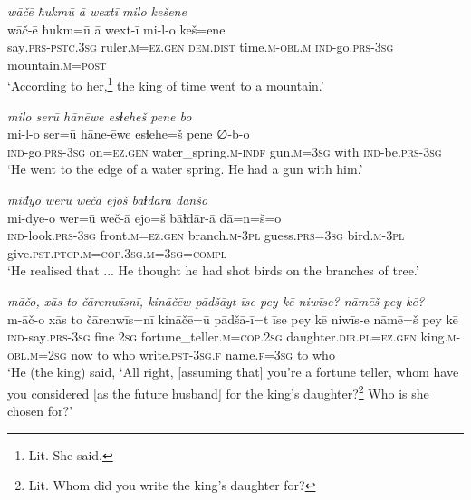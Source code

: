 \ea \label{KŠ.3}
\textit{wāčē ħukmū ā wextī milo kešene} \\ 
\gll wāč-ē ħukm=ū ā wext-ī mi-l-o keš=ene \\ 
 say\textsc{.prs}\textsc{-pstc}\textsc{.3sg} ruler\textsc{.m}\textsc{=ez.gen} \textsc{dem.dist} time\textsc{.m}\textsc{-obl}\textsc{.m} \textsc{ind-}go\textsc{.prs}\textsc{-3sg} mountain\textsc{.m}\textsc{=\textsc{post}} \\ 
\glt `According to her,\footnote{Lit. She said.} the king of time went to a mountain.'
\z 
 
\ea \label{KŠ.4}
\textit{milo serū hānēwe esɫeheš pene bo} \\ 
\gll mi-l-o ser=ū hāne-ēwe esɫehe=š pene ∅-b-o \\ 
 \textsc{ind-}go\textsc{.prs}\textsc{-3sg} on\textsc{=ez.gen} water\_spring\textsc{.m}\textsc{-indf} gun\textsc{.m}\textsc{=3sg} with \textsc{ind-}be\textsc{.prs}\textsc{-3sg} \\ 
\glt `He went to the edge of a water spring. He had a gun with him.'
\z 
 
\ea \label{KŠ.5}
\textit{miđyo werū wečā ejoš bāɫdārā dānšo} \\ 
\gll mi-đye-o wer=ū weč-ā ejo=š bāɫdār-ā dā=n=š=o \\ 
 \textsc{ind-}look\textsc{.prs}\textsc{-3sg} front\textsc{.m}\textsc{=ez.gen} branch\textsc{.m}\textsc{-3pl} guess\textsc{.prs}\textsc{=3sg} bird\textsc{.m}\textsc{-3pl} give\textsc{.pst}\textsc{.ptcp}\textsc{.m}\textsc{=cop}\textsc{.3sg}\textsc{.m}\textsc{=3sg}\textsc{=compl} \\ 
\glt `He realised that ... He thought he had shot birds on the branches of tree.'
\z 
 
\ea \label{KŠ.12}
\textit{māčo, xās to čārenwīsnī, kināčēw pādšāyt īse pey kē niwīse? nāmēš pey kē?} \\ 
\gll m-āč-o xās to čārenwīs=nī kināčē=ū pādšā-ī=t īse pey kē niwīs-e nāmē=š pey kē \\ 
 \textsc{ind-}say\textsc{.prs}\textsc{-3sg} fine \textsc{2sg} fortune\_teller\textsc{.m}\textsc{=cop}\textsc{.\textsc{2sg}} daughter\textsc{.dir}\textsc{.pl}\textsc{=ez.gen} king\textsc{.m}\textsc{-obl}\textsc{.m}\textsc{=\textsc{2sg}} now to who write\textsc{.pst}\textsc{-3sg}\textsc{.f} name\textsc{.f}\textsc{=3sg} to who \\ 
\glt `He (the king) said, ‘All right, [assuming that] you’re a fortune teller, whom have you considered [as the future husband] for the king’s daughter?\footnote{Lit. Whom did you write the king’s daughter for?} Who is she chosen for?'
\z 
 
